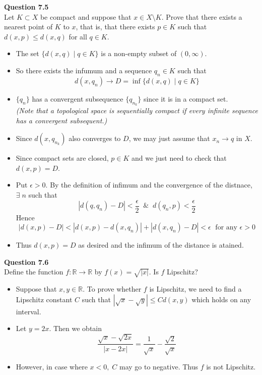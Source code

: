 \documentclass[12pt]{article}
\begin{document}
\vspace{1.5\baselineskip}
\textbf{Question 7.5}\\
Let $K\subset X$ be compact and suppose that $x\in X\setminus K$. Prove that there exists a nearest point of $K$ to $x$, that is, that there exists $p\in K$ such that $d(x,p)\le d(x,q)$ for all $q\in K$.
\begin{itemize}
    \item The set $\{d(x,q)\;|\;q\in K\}$ is a non-empty subset of $(0,\infty)$.
    \item So there exists the infumum and a sequence $q_n\in K$ such that 
    $$d(x,q_n)\to D = \inf\{d(x,q)\;|\;q\in K\}$$
    \item $\{q_n\}$ has a convergent subsequence $\{q_{n_k}\}$ since it is in a compact set.\\
    {\sl (Note that a topological space is sequentially compact if every infinite sequence has a convergent subsequent.)}
    \item Since $d(x,q_{n_k})$ also converges to $D$, we may just assume that $x_n\to q$ in $X$.
    \item Since compact sets are closed, $p\in K$ and we just need to check that $d(x,p)=D$.
    \item Put $\epsilon>0$. By the definition of infimum and the convergence of the distnace, $\exists\;n$ such that 
    $$|d(q,q_n)-D| <\frac{\epsilon}{2}\;\;\&\;\; d(q_n,p)<\frac{\epsilon}{2}$$
    Hence
    $$|d(x,p)-D|<|d(x,p)-d(x,q_n)|+|d(x,q_n)-D|<\epsilon\; \text{  for any $\epsilon>0$}$$
    \item Thus $d(x,p)=D$ as desired and the infimum of the distance is atained.
\end{itemize}
\vspace{1.5\baselineskip}
\textbf{Question 7.6}\\
Define the function $f\colon\mathbb{R}\rightarrow\mathbb{R}$ by $f(x)=\sqrt{|x|}$. Is $f$ Lipschitz?
\begin{itemize}
    \item Suppose that $x,y\in \mathbb{R}$. To prove whether $f$ is Lipschitz, we need to find a Lipschitz constant $C$ such that $|\sqrt{x}-\sqrt{y}|\le Cd(x,y)$ which holds on any interval.
    \item Let $y=2x$. Then we obtain 
    $$\frac{\sqrt{x}-\sqrt{2x}}{|x-2x|}=\frac{1}{\sqrt{x}}-\frac{\sqrt{2}}{\sqrt{x}}$$
    \item However, in case where $x<0,\; C$ may go to negative. Thus $f$ is not Lipschitz.
\end{itemize}
\end{document}
